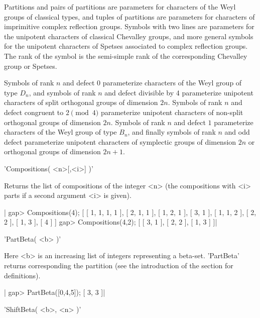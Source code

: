 Partitions  and pairs  of partitions  are parameters  for characters of the
Weyl groups of classical types, and tuples of partitions are parameters for
characters of imprimitive complex reflection groups. Symbols with two lines
are  parameters for the unipotent characters of classical Chevalley groups,
and more general symbols for the unipotent characters of Spetses associated
to  complex reflection  groups. The  rank of  the symbol is the semi-simple
rank of the corresponding Chevalley group or Spetses.

Symbols  of rank  $n$ and  defect $0$  parameterize characters  of the Weyl
group  of type  $D_n$, and  symbols of  rank $n$  and defect divisible by 4
parameterize  unipotent characters of split  orthogonal groups of dimension
$2n$.  Symbols of rank $n$ and defect congruent to $2 \pmod 4$ parameterize
unipotent  characters  of  non-split  orthogonal  groups of dimension $2n$.
Symbols  of rank  $n$ and  defect $1$  parameterize characters  of the Weyl
group  of  type  $B_n$,  and  finally  symbols  of  rank $n$ and odd defect
parameterize unipotent characters of symplectic groups of dimension $2n$ or
orthogonal groups of dimension $2n+1$.

%
%

'Compositions( <n>[,<i>] )'

Returns  the list of compositions of the integer <n> (the compositions with
<i> parts if a second argument <i> is given).

|    gap> Compositions(4);
    [ [ 1, 1, 1, 1 ], [ 2, 1, 1 ], [ 1, 2, 1 ], [ 3, 1 ], [ 1, 1, 2 ],
      [ 2, 2 ], [ 1, 3 ], [ 4 ] ]
    gap> Compositions(4,2);
    [ [ 3, 1 ], [ 2, 2 ], [ 1, 3 ] ]|

%
%

'PartBeta( <b> )'

Here  <b>  is  an  increasing  list  of  integers  representing a beta-set.
'PartBeta' returns corresponding the partition (see the introduction of the
section for definitions).

|    gap> PartBeta([0,4,5]);
    [ 3, 3 ]|

%
%

'ShiftBeta( <b>, <n> )'

